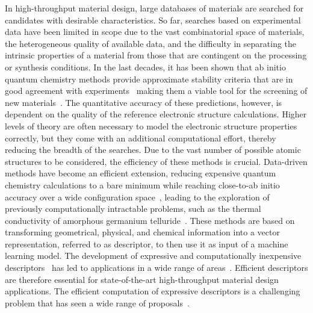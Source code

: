 In high-throughput material design, large databases of materials are searched for candidates with desirable characteristics.
So far, searches based on experimental data have been limited in scope due to the vast combinatorial space of materials, the heterogeneous quality of available data, and the difficulty in separating the intrinsic properties of a material from those that are contingent on the processing or synthesis conditions.
In the last decades, it has been shown that ab initio quantum chemistry methods provide approximate stability criteria that are in good agreement with experiments~\cite{jansen2015conceptual} making them a viable tool for the screening of new materials~\cite{ceder1998identification, andersson2006toward, yang2012search, gomez2016design}.
The quantitative accuracy of these predictions, however, is dependent on the quality of the reference electronic structure calculations. 
Higher levels of theory are often necessary to model the electronic structure properties correctly, but they come with an additional computational effort, thereby reducing the breadth of the searches.
Due to the vast number of possible atomic structures to be considered, the efficiency of these methods is crucial.
Data-driven methods have become an efficient extension, reducing expensive quantum chemistry calculations to a bare minimum while reaching close-to-ab initio accuracy over a wide configuration space~\cite{bartok2018machine}, leading to the exploration of previously computationally intractable problems, such as the thermal conductivity of amorphous germanium telluride~\cite{sosso2012thermal}. 
These methods are based on transforming geometrical, physical, and chemical information into a vector representation, referred to as descriptor, to then use it as input of a machine learning model.
The development of expressive and computationally inexpensive descriptors~\cite{behl11jcp, bartok2013representing} has led to applications in a wide range of areas~\cite{mansouri2018machine, sosso2018understanding, basdogan2019machine}. 
Efficient descriptors are therefore essential for state-of-the-art high-throughput material design applications.
The efficient computation of expressive descriptors is a challenging problem that has seen a wide range of proposals~\cite{behl11jcp, rupp2012fast, bartok2013representing, huo2017unified}.
